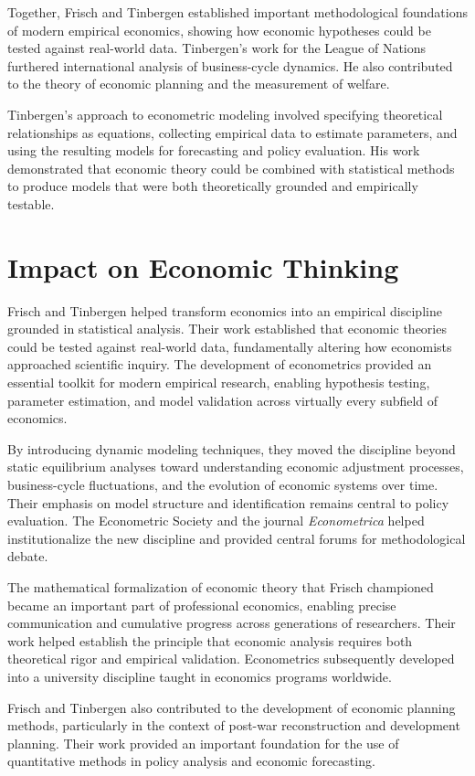 Together, Frisch and Tinbergen established important methodological foundations of modern
empirical economics, showing how economic hypotheses could be tested against real-world data.
Tinbergen's work for the League of Nations furthered international analysis of business-cycle
dynamics. He also contributed to the theory of economic planning and the measurement of welfare.

Tinbergen's approach to econometric modeling involved specifying theoretical relationships as
equations, collecting empirical data to estimate parameters, and using the resulting models for
forecasting and policy evaluation. His work demonstrated that economic theory could be combined
with statistical methods to produce models that were both theoretically grounded and empirically
testable.

\section{Impact on Economic Thinking}
Frisch and Tinbergen helped transform economics into an empirical discipline grounded in
statistical analysis. Their work established that economic theories could be tested against
real-world data, fundamentally altering how economists approached scientific inquiry. The
development of econometrics provided an essential toolkit for modern empirical research, enabling
hypothesis testing, parameter estimation, and model validation across virtually every subfield
of economics.

By introducing dynamic modeling techniques, they moved the discipline beyond static equilibrium
analyses toward understanding economic adjustment processes, business-cycle fluctuations, and the
evolution of economic systems over time. Their emphasis on model structure and identification
remains central to policy evaluation. The Econometric Society and the journal \textit{Econometrica}
helped institutionalize the new discipline and provided central forums for methodological debate.

The mathematical formalization of economic theory that Frisch championed became an important part
of professional economics, enabling precise communication and cumulative progress across
generations of researchers. Their work helped establish the principle that economic analysis
requires both theoretical rigor and empirical validation. Econometrics subsequently developed
into a university discipline taught in economics programs worldwide.

Frisch and Tinbergen also contributed to the development of economic planning methods,
particularly in the context of post-war reconstruction and development planning. Their work
provided an important foundation for the use of quantitative methods in policy analysis and
economic forecasting.

